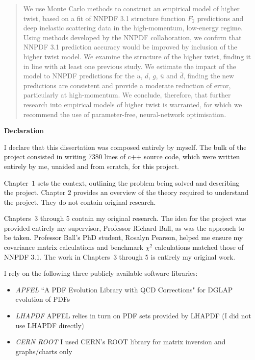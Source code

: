 \documentclass[12pt,a4paper]{report}
\begin{document}
\newpage

\begin{abstract}
We use Monte Carlo methods to construct an empirical model of higher twist, based on a fit of NNPDF 3.1 structure function $F_2$ predictions and deep inelastic scattering data in the high-momentum, low-energy regime. Using methods developed by the NNPDF collaboration, we confirm that NNPDF 3.1 prediction accuracy would be improved by inclusion of the higher twist model. We examine the structure of the higher twist, finding it in line with at least one previous study. We estimate the impact of the model to NNPDF predictions for the $u$, $d$, $g$, $\bar{u}$ and $\bar{d}$, finding the new predictions are consistent and provide a moderate reduction of error, particularly at high-momentum. We conclude, therefore, that further research into empirical models of higher twist is warranted, for which we recommend the use of parameter-free, neural-network optimisation.
\end{abstract}


\begin{center}
\textbf{Declaration}
\end{center}

I declare that this dissertation was composed entirely by myself. The bulk of the project consisted in writing 7380 lines of c++ source code, which were written entirely by me, unaided and from scratch, for this project.

Chapter~1 sets the context, outlining the problem being solved and describing the project. Chapter 2 provides an overview of the theory required to understand the project. They do not contain original research.

Chapters~3 through 5 contain my original research. The idea for the project was provided entirely my supervisor, Professor Richard Ball, as was the approach to be taken. Professor Ball's PhD student, Rosalyn Pearson, helped me ensure my covariance matrix calculations and benchmark $\chi^2$ calculations matched those of NNPDF 3.1. The work in Chapters~3 through 5 is entirely my original work.

\bigskip

I rely on the following three publicly available software libraries:
\begin{itemize}
\item \emph{APFEL}\cite{APFEL} ``A PDF Evolution Library with QCD Corrections" for DGLAP evolution of PDFs
\item \emph{LHAPDF}\cite{LHAPDF} APFEL relies in turn on PDF sets provided by LHAPDF (I did not use LHAPDF directly)
\item  \emph{CERN ROOT}\cite{ROOT} I used CERN's ROOT library for matrix inversion and graphs/charts only
\end{itemize}
\end{document}

